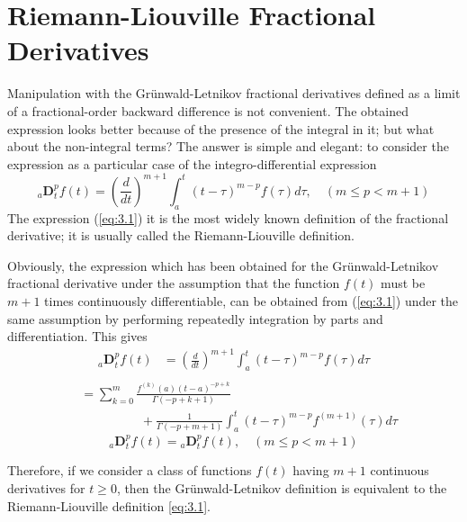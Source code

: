 \documentclass[a4paper,14pt,oneside]{book}
\theoremstyle{plain}
\theoremstyle{definition}
\theoremstyle{remark}
\begin{document}
         \chapter{Riemann-Liouville Fractional Derivatives}
         \begin{center}
\begin{flushleft} 
\justify
\Large{
Manipulation with the Grünwald-Letnikov fractional derivatives defined as a limit of a fractional-order backward difference is not convenient. The obtained expression looks better because of the presence of the integral in it; but what about the non-integral terms? The answer is simple and elegant: to consider the expression as a particular case of the integro-differential expression
\begin{equation}\label{eq:3.1}
{ }_{a} \mathbf{D}_{t}^{p} f(t)=\left(\frac{d}{d t}\right)^{m+1} \int_{a}^{t}(t-\tau)^{m-p} f(\tau) d \tau, \quad(m \leq p<m+1)
\end{equation}
The expression (\ref{eq:3.1}) it is the most widely known definition of the fractional derivative; it is usually called the Riemann-Liouville definition.
\par Obviously, the expression which has been obtained for the Grünwald-Letnikov fractional derivative under the assumption that the function $f(t)$ must be $m+1$ times continuously differentiable, can be obtained from (\ref{eq:3.1}) under the same assumption by performing repeatedly integration by parts and differentiation. This gives
$$
\begin{aligned}
{ }_{a} \mathbf{D}_{t}^{p} f(t) &=\left(\frac{d}{d t}\right)^{m+1} \int_{a}^{t}(t-\tau)^{m-p} f(\tau) d \tau \\
\end{aligned}
$$
$$
\begin{aligned}
&=\sum_{k=0}^{m} \frac{f^{(k)}(a)(t-a)^{-p+k}}{\Gamma(-p+k+1)}\\ & \hspace{2cm} +\frac{1}{\Gamma(-p+m+1)} \int_{a}^{t}(t-\tau)^{m-p} f^{(m+1)}(\tau) d \tau 
\end{aligned}
$$
\vspace{0.5cm}
\begin{equation}\label{eq:3.2}
{ }_{a} \mathbf{D}_{t}^{p} f(t) ={ }_{a} \mathbf{D}_{t}^{p} f(t), \quad(m \leq p<m+1)
\end{equation}
\par Therefore, if we consider a class of functions $f(t)$ having $m+1$ continuous derivatives for $t \geq 0$, then the Grünwald-Letnikov definition is equivalent to the Riemann-Liouville definition \ref{eq:3.1}. \\
}
\end{flushleft}
\end{center}
\end{document}
